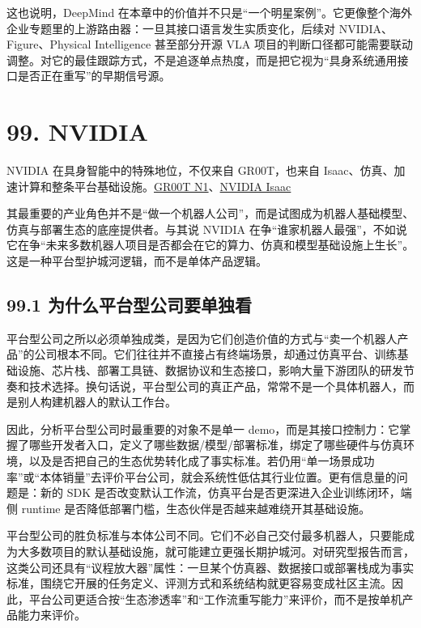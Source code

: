 这也说明，DeepMind 在本章中的价值并不只是“一个明星案例”。它更像整个海外企业专题里的上游路由器：一旦其接口语言发生实质变化，后续对 NVIDIA、Figure、Physical Intelligence 甚至部分开源 VLA 项目的判断口径都可能需要联动调整。对它的最佳跟踪方式，不是追逐单点热度，而是把它视为“具身系统通用接口是否正在重写”的早期信号源。

\section*{99. NVIDIA}

NVIDIA 在具身智能中的特殊地位，不仅来自 GR00T，也来自 Isaac、仿真、加速计算和整条平台基础设施。\href{https://arxiv.org/abs/2503.14734}{GR00T N1}、\href{https://developer.nvidia.com/isaac}{NVIDIA Isaac}

其最重要的产业角色并不是“做一个机器人公司”，而是试图成为机器人基础模型、仿真与部署生态的底座提供者。与其说 NVIDIA 在争“谁家机器人最强”，不如说它在争“未来多数机器人项目是否都会在它的算力、仿真和模型基础设施上生长”。这是一种平台型护城河逻辑，而不是单体产品逻辑。

\subsection*{99.1 为什么平台型公司要单独看}


平台型公司之所以必须单独成类，是因为它们创造价值的方式与“卖一个机器人产品”的公司根本不同。它们往往并不直接占有终端场景，却通过仿真平台、训练基础设施、芯片栈、部署工具链、数据协议和生态接口，影响大量下游团队的研发节奏和技术选择。换句话说，平台型公司的真正产品，常常不是一个具体机器人，而是别人构建机器人的默认工作台。

因此，分析平台型公司时最重要的对象不是单一 demo，而是其接口控制力：它掌握了哪些开发者入口，定义了哪些数据/模型/部署标准，绑定了哪些硬件与仿真环境，以及是否把自己的生态优势转化成了事实标准。若仍用“单一场景成功率”或“本体销量”去评价平台公司，就会系统性低估其行业位置。更有信息量的问题是：新的 SDK 是否改变默认工作流，仿真平台是否更深进入企业训练闭环，端侧 runtime 是否降低部署门槛，生态伙伴是否越来越难绕开其基础设施。

平台型公司的胜负标准与本体公司不同。它们不必自己交付最多机器人，只要能成为大多数项目的默认基础设施，就可能建立更强长期护城河。对研究型报告而言，这类公司还具有“议程放大器”属性：一旦某个仿真器、数据接口或部署栈成为事实标准，围绕它开展的任务定义、评测方式和系统结构就更容易变成社区主流。因此，平台公司更适合按“生态渗透率”和“工作流重写能力”来评价，而不是按单机产品能力来评价。

